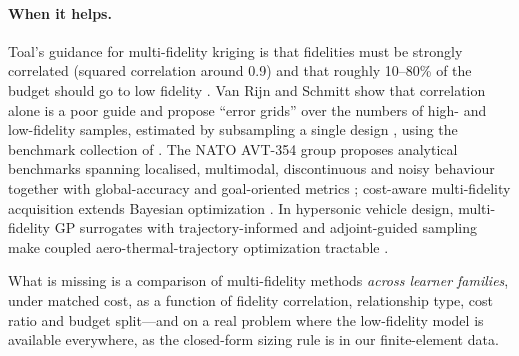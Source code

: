 \paragraph{When it helps.} Toal's guidance for multi-fidelity kriging is that fidelities must be strongly correlated
(squared correlation around 0.9) and that roughly 10--80\% of the budget should go to low fidelity
\cite{toal2015some}. Van Rijn and Schmitt show that correlation alone is a poor guide and propose ``error grids'' over the
numbers of high- and low-fidelity samples, estimated by subsampling a single design \cite{vanrijn2021finding}, using the
benchmark collection of \cite{vanrijn2020mf2}. The NATO AVT-354 group proposes analytical benchmarks spanning localised,
multimodal, discontinuous and noisy behaviour together with global-accuracy and goal-oriented metrics
\cite{mainini2022analytical,mainini2025framework}; cost-aware multi-fidelity acquisition extends Bayesian optimization
\cite{kandasamy2016gaussian}. In hypersonic vehicle design, multi-fidelity GP surrogates with trajectory-informed and
adjoint-guided sampling make coupled aero-thermal-trajectory optimization tractable
\cite{needels2024trajectory,needels2024efficient}.

What is missing is a comparison of multi-fidelity methods \emph{across learner families}, under matched cost, as a
function of fidelity correlation, relationship type, cost ratio and budget split---and on a real problem where the
low-fidelity model is available everywhere, as the closed-form sizing rule is in our finite-element data.
